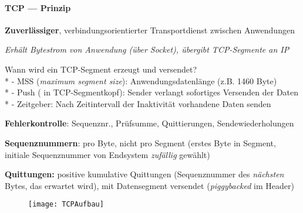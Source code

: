\paragraph{TCP --- Prinzip}
\begin{items}
	\item \textbf{Zuverlässiger}, verbindungsorientierter Transportdienst zwischen Anwendungen
  \item \emph{Erhält Bytestrom von Anwendung (über Socket), übergibt TCP-Segmente an IP}
  \item Wann wird ein TCP-Segment erzeugt und versendet?\\*
    - MSS (\emph{maximum segment size}): Anwendungsdatenlänge (z.B. 1460 Byte) \\*
    - Push ( in TCP-Segmentkopf): Sender verlangt sofortiges Versenden der Daten \\*
    - Zeitgeber: Nach Zeitintervall der Inaktivität vorhandene Daten senden
  \item \textbf{Fehlerkontrolle}: Sequenznr., Prüfsumme, Quittierungen, Sendewiederholungen
  \item \textbf{Sequenznummern}: pro Byte, nicht pro Segment (erstes Byte in Segment, initiale Sequenznummer von Endsystem \emph{zufällig} gewählt)
  \item \textbf{Quittungen: } positive kumulative Quittungen (Sequenznummer des \emph{nächsten} Bytes, das erwartet wird), mit Datensegment versendet (\emph{piggybacked} im Header)
\end{items}
\begin{figure}[H]\centering\label{TCPAufbau}\texttt{[image: TCPAufbau]}\end{figure}


